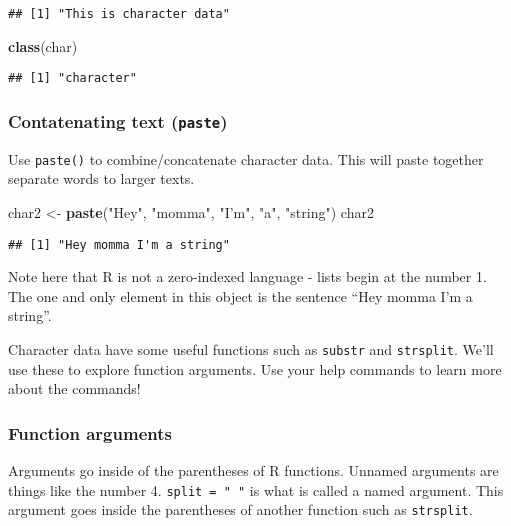 \documentclass[]{article}
\newenvironment{Shaded}{\begin{snugshade}}{\end{snugshade}}
\newcommand{\KeywordTok}[1]{\textcolor[rgb]{0.13,0.29,0.53}{\textbf{#1}}}
\newcommand{\StringTok}[1]{\textcolor[rgb]{0.31,0.60,0.02}{#1}}
\newcommand{\NormalTok}[1]{#1}
\begin{document}
\begin{verbatim}
## [1] "This is character data"
\end{verbatim}

\begin{Shaded}
\begin{Highlighting}[]
\KeywordTok{class}\NormalTok{(char)}
\end{Highlighting}
\end{Shaded}

\begin{verbatim}
## [1] "character"
\end{verbatim}

\subsubsection{\texorpdfstring{Contatenating text
(\texttt{paste})}{Contatenating text (paste)}}\label{contatenating-text-paste}

Use \texttt{paste()} to combine/concatenate character data. This will
paste together separate words to larger texts.

\begin{Shaded}
\begin{Highlighting}[]
\NormalTok{char2 <-}\StringTok{ }\KeywordTok{paste}\NormalTok{(}\StringTok{"Hey"}\NormalTok{, }\StringTok{"momma"}\NormalTok{, }\StringTok{"I'm"}\NormalTok{, }\StringTok{"a"}\NormalTok{, }\StringTok{"string"}\NormalTok{)}
\NormalTok{char2}
\end{Highlighting}
\end{Shaded}

\begin{verbatim}
## [1] "Hey momma I'm a string"
\end{verbatim}

Note here that R is not a zero-indexed language - lists begin at the
number 1. The one and only element in this object is the sentence ``Hey
momma I'm a string''.

Character data have some useful functions such as \texttt{substr} and
\texttt{strsplit}. We'll use these to explore function arguments. Use
your help commands to learn more about the commands!

\subsubsection{Function arguments}\label{function-arguments}

Arguments go inside of the parentheses of R functions. Unnamed arguments
are things like the number 4. \texttt{split\ =\ "\ "} is what is called
a named argument. This argument goes inside the parentheses of another
function such as \texttt{strsplit}.
\end{document}
